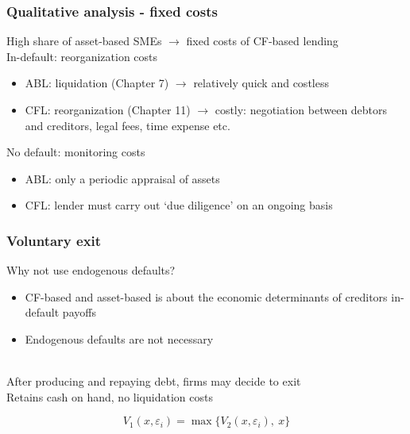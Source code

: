 \documentclass[notes]{beamer}
\begin{document}
\begin{frame}[label=fc] \frametitle{Qualitative analysis - fixed costs}
High share of asset-based SMEs $\rightarrow$  fixed costs of CF-based lending \vspace{5mm} \\

In-default:  reorganization costs
\begin{itemize}
\item ABL: liquidation (Chapter 7)  $\rightarrow$ relatively quick and costless
\item CFL: reorganization (Chapter 11) $\rightarrow$ costly: negotiation between debtors and creditors, legal fees, time expense etc.
\end{itemize} \vspace{2mm}
No default: monitoring costs
\begin{itemize}
\item ABL: only a periodic appraisal of assets
\item CFL: lender must carry out `due diligence' on an ongoing basis
\end{itemize}

\begin{center}
\hyperlink{nameit}{}
\end{center}
\end{frame}


\begin{frame}[label=volex] \frametitle{Voluntary exit}

Why not use endogenous defaults? 
\begin{itemize} \setlength\itemsep{0em}
    \item CF-based and asset-based is about the economic determinants of creditors in-default payoffs
    \item Endogenous defaults are not necessary   
\end{itemize} \vspace{1mm} \\

After producing and repaying debt, firms may decide to exit \vspace{1mm} \\
Retains cash on hand, no liquidation costs

$$ V_1(x,\varepsilon_i) = \max \Big\{ V_2(x,\varepsilon_i), \ x \Big\} $$

\vfill
\begin{center}
\hyperlink{exdef}{}
\end{center}

\end{frame}
\end{document}
